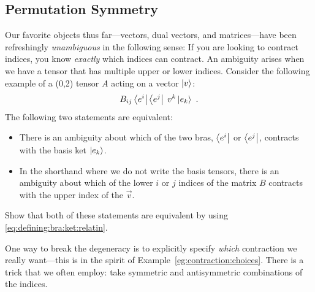 \documentclass[12pt, oneside]{report}    %
\let\oldsection\section
\def\section{%
  \setcounter{sidenote}{1}%
  \oldsection
}
\begin{document}
\begin{subappendices}


\section{Permutation Symmetry}\label{sec:permutation:symmerty}

Our favorite objects thus far---vectors, dual vectors, and matrices---have been refreshingly \emph{unambiguous} in the following sense: If you are looking to contract indices, you know \emph{exactly} which indices can contract. An ambiguity arises when we have a tensor that has multiple upper or lower indices. Consider the following example of a (0,2) tensor $A$ acting on a vector $\left|v\right\rangle$:
\begin{align}
    B_{ij}\left\langle e^i\right|\left\langle e^j\right| \; v^k \left|e_k\right\rangle \ .
\end{align}
The following two statements are equivalent:
\begin{itemize}
    \item There is an ambiguity about which of the two bras, $\left\langle e^i\right|$ or $\left\langle e^j\right|$, contracts with the basis ket $\left|e_k\right\rangle$. 
    \item In the shorthand where we do not write the basis tensors, there is an ambiguity about which of the lower $i$ or $j$ indices of the matrix $B$ contracts with the upper index of the $\vec{v}$.
\end{itemize}
\begin{exercise}
Show that both of these statements are equivalent by using \eqref{eq:defining:bra:ket:relatin}. 
\end{exercise}
One way to break the degeneracy is to explicitly specify \emph{which} contraction we really want---this is in the spirit of Example~\ref{eg:contraction:choices}. There is a trick that we often employ: take symmetric and antisymmetric combinations of the indices.


\end{subappendices}
\end{document}
